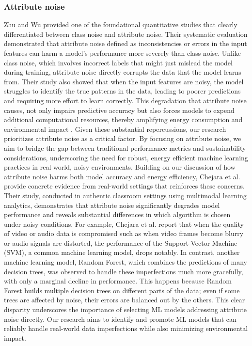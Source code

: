 \documentclass[conference]{IEEEtran}
\begin{document}
\subsubsection*{Attribute noise}
Zhu and Wu \cite{wuzu} provided one of the foundational quantitative studies that clearly differentiated between class noise and attribute noise. Their systematic evaluation demonstrated that attribute noise defined as inconsistencies or errors in the input features can harm a model's performance more severely than class noise. Unlike class noise, which involves incorrect labels that might just mislead the model during training, attribute noise directly corrupts the data that the model learns from. Their study also showed that when the input features are noisy, the model struggles to identify the true patterns in the data, leading to poorer predictions and requiring more effort to learn correctly.\newline
\newline
This degradation that attribute noise causes, not only impairs predictive accuracy but also forces models to expend additional computational resources, thereby amplifying energy consumption and environmental impact \cite{wuzu}. Given these substantial repercussions, our research prioritizes attribute noise as a critical factor. By focusing on attribute noise, we aim to bridge the gap between traditional performance metrics and sustainability considerations, underscoring the need for robust, energy efficient machine learning practices in real world, noisy environments.
\newline
\newline
Building on our discussion of how attribute noise harms both model accuracy and energy efficiency, Chejara et al. \cite{chejara2024impact} provide concrete evidence from real-world settings that reinforces these concerns. Their study, conducted in authentic classroom settings using multimodal learning analytics, demonstrates that attribute noise significantly degrades model performance and reveals substantial differences in which algorithm is chosen under noisy conditions. For example, Chejara et al. \cite{chejara2024impact} report that when the quality of video or audio data is compromised such as when video frames become blurry or audio signals are distorted, the performance of the Support Vector Machine (SVM), a common machine learning model, drops notably. In contrast, another machine learning model, Random Forest, which combines the predictions of many decision trees, was observed to handle these imperfections much more gracefully, with only a marginal decline in performance. This happens because Random Forest builds multiple decision trees on different parts of the data; even if some trees are affected by noise, their errors are balanced out by the others. This clear disparity underscores the importance of selecting ML models addressing attribute noise directly. Our research aims to identify and promote ML models that can reliably handle real-world data imperfections while also minimizing environmental impact.
\newline
\newline
\end{document}
